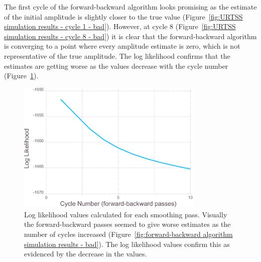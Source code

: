 The first cycle of the forward-backward algorithm looks promising as the estimate of the initial amplitude is slightly closer to the true value (Figure~\ref{fig:URTSS simulation results - cycle 1 - bad}).
However, at cycle 8 (Figure~\ref{fig:URTSS simulation results - cycle 8 - bad}) it is clear that the forward-backward algorithm is converging to a point where every amplitude estimate is zero, which is not representative of the true amplitude.
The log likelihood confirms that the estimates are getting worse as the values decrease with the cycle number (Figure~\ref{fig:Simulation Log likelihood - bad}).

\begin{figure}[ht!]
    \centering
    \includegraphics[width=0.8\textwidth]{figures/datared/loglik_bad.pdf}
    \caption[Log likelihood values calculated at the end of each smoothing pass for a strong reflection.]{Log likelihood values calculated for each smoothing pass.
    Visually the forward-backward passes seemed to give worse estimates as the number of cycles increased (Figure~\ref{fig:forward-backward algorithm simulation results - bad}).
    The log likelihood values confirm this as evidenced by the decrease in the values.}
    \label{fig:Simulation Log likelihood - bad}
\end{figure}

